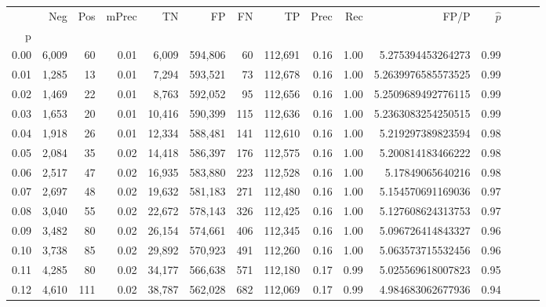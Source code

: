 \begin{tabular}{rrrrrrrrrrrrrrr}
\toprule
{} &     Neg &    Pos & mPrec &       TN &       FP &       FN &       TP &  Prec &   Rec &                  FP/P & $\hat{p}$ \\
p    &         &        &       &          &          &          &          &       &       &                       &           \\
\midrule
0.00 &   6,009 &     60 &  0.01 &    6,009 &  594,806 &       60 &  112,691 &  0.16 &  1.00 &     5.275394453264273 &      0.99 \\
0.01 &   1,285 &     13 &  0.01 &    7,294 &  593,521 &       73 &  112,678 &  0.16 &  1.00 &    5.2639976585573525 &      0.99 \\
0.02 &   1,469 &     22 &  0.01 &    8,763 &  592,052 &       95 &  112,656 &  0.16 &  1.00 &    5.2509689492776115 &      0.99 \\
0.03 &   1,653 &     20 &  0.01 &   10,416 &  590,399 &      115 &  112,636 &  0.16 &  1.00 &    5.2363083254250515 &      0.99 \\
0.04 &   1,918 &     26 &  0.01 &   12,334 &  588,481 &      141 &  112,610 &  0.16 &  1.00 &     5.219297389823594 &      0.98 \\
0.05 &   2,084 &     35 &  0.02 &   14,418 &  586,397 &      176 &  112,575 &  0.16 &  1.00 &     5.200814183466222 &      0.98 \\
0.06 &   2,517 &     47 &  0.02 &   16,935 &  583,880 &      223 &  112,528 &  0.16 &  1.00 &      5.17849065640216 &      0.98 \\
0.07 &   2,697 &     48 &  0.02 &   19,632 &  581,183 &      271 &  112,480 &  0.16 &  1.00 &     5.154570691169036 &      0.97 \\
0.08 &   3,040 &     55 &  0.02 &   22,672 &  578,143 &      326 &  112,425 &  0.16 &  1.00 &     5.127608624313753 &      0.97 \\
0.09 &   3,482 &     80 &  0.02 &   26,154 &  574,661 &      406 &  112,345 &  0.16 &  1.00 &     5.096726414843327 &      0.96 \\
0.10 &   3,738 &     85 &  0.02 &   29,892 &  570,923 &      491 &  112,260 &  0.16 &  1.00 &     5.063573715532456 &      0.96 \\
0.11 &   4,285 &     80 &  0.02 &   34,177 &  566,638 &      571 &  112,180 &  0.17 &  0.99 &     5.025569618007823 &      0.95 \\
0.12 &   4,610 &    111 &  0.02 &   38,787 &  562,028 &      682 &  112,069 &  0.17 &  0.99 &     4.984683062677936 &      0.94 \\

\end{tabular}
